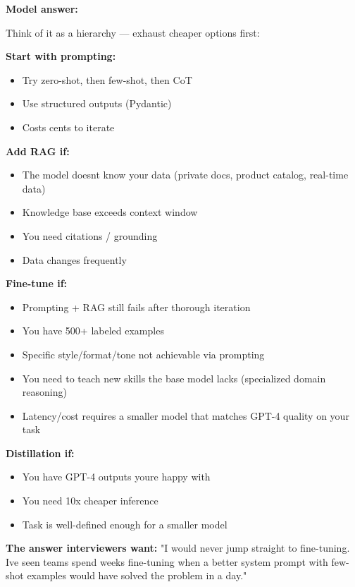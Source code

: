 \documentclass[11pt]{article}
\providecommand{\tightlist}{\setlength{\itemsep}{1pt}\setlength{\parskip}{0pt}}
\begin{document}
\textbf{Model answer:}

Think of it as a hierarchy --- exhaust cheaper options first:

\textbf{Start with prompting:}

\begin{itemize}
\tightlist
\item
  Try zero-shot, then few-shot, then CoT
\item
  Use structured outputs (Pydantic)
\item
  Costs cents to iterate
\end{itemize}

\textbf{Add RAG if:}

\begin{itemize}
\tightlist
\item
  The model doesn\textquotesingle t know your data (private docs, product catalog, real-time data)
\item
  Knowledge base exceeds context window
\item
  You need citations / grounding
\item
  Data changes frequently
\end{itemize}

\textbf{Fine-tune if:}

\begin{itemize}
\tightlist
\item
  Prompting + RAG still fails after thorough iteration
\item
  You have 500+ labeled examples
\item
  Specific style/format/tone not achievable via prompting
\item
  You need to teach new skills the base model lacks (specialized domain reasoning)
\item
  Latency/cost requires a smaller model that matches GPT-4 quality on your task
\end{itemize}

\textbf{Distillation if:}

\begin{itemize}
\tightlist
\item
  You have GPT-4 outputs you\textquotesingle re happy with
\item
  You need 10x cheaper inference
\item
  Task is well-defined enough for a smaller model
\end{itemize}

\textbf{The answer interviewers want:} "I would never jump straight to fine-tuning. I\textquotesingle ve seen teams spend weeks fine-tuning when a better system prompt with few-shot examples would have solved the problem in a day."
\end{document}
